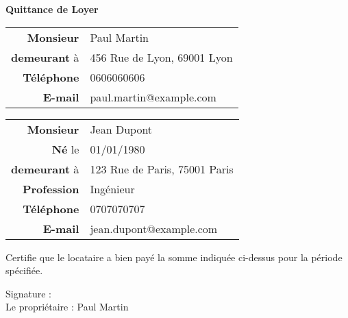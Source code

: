 \documentclass{article}
\begin{document}
\begin{center}
    \Large\textbf{Quittance de Loyer}
\end{center}

\noindent

\begin{tabular}{rl}
    \textbf{Monsieur} & Paul Martin \\
    \textbf{demeurant} à & 456 Rue de Lyon, 69001 Lyon \\
    \textbf{Téléphone} & 0606060606 \\
    \textbf{E-mail} & paul.martin@example.com
\end{tabular}

\vspace{0.5cm}

\begin{tabular}{rl}
    \textbf{Monsieur} & Jean Dupont \\
    \textbf{Né} le & 01/01/1980 \\
    \textbf{demeurant} à & 123 Rue de Paris, 75001 Paris \\
    \textbf{Profession} & Ingénieur \\
    \textbf{Téléphone} & 0707070707 \\
    \textbf{E-mail} & jean.dupont@example.com
\end{tabular}

\vspace{1cm}

\noindent
Certifie que le locataire a bien payé la somme indiquée ci-dessus pour la période spécifiée.

\vspace{2cm}

\noindent
Signature : \\
Le propriétaire : Paul Martin
\end{document}
